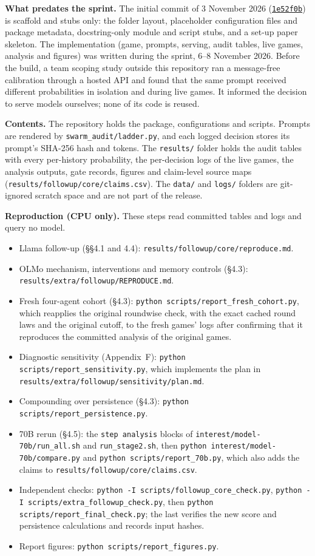 \documentclass[11pt,letterpaper]{article}
\begin{document}
\textbf{What predates the sprint.}
The initial commit of 3 November 2026 (\href{https://github.com/AbdulMusthakin/swarm-audit/commit/1e52f0b}{\texttt{1e52f0b}}) is scaffold and stubs only: the folder layout, placeholder configuration files and package metadata, docstring-only module and script stubs, and a set-up paper skeleton.
The implementation (game, prompts, serving, audit tables, live games, analysis and figures) was written during the sprint, 6--8 November 2026.
Before the build, a team scoping study outside this repository ran a message-free calibration through a hosted API and found that the same prompt received different probabilities in isolation and during live games.
It informed the decision to serve models ourselves; none of its code is reused.

\textbf{Contents.}
The repository holds the package, configurations and scripts.
Prompts are rendered by \texttt{swarm\_audit/ladder.py}, and each logged decision stores its prompt's SHA-256 hash and tokens.
The \texttt{results/} folder holds the audit tables with every per-history probability, the per-decision logs of the live games, the analysis outputs, gate records, figures and claim-level source maps (\texttt{results/followup/core/claims.csv}).
The \texttt{data/} and \texttt{logs/} folders are git-ignored scratch space and are not part of the release.

\textbf{Reproduction (CPU only).}
These steps read committed tables and logs and query no model.
\begin{itemize}
  \item Llama follow-up (§§4.1 and 4.4): \texttt{results/followup/core/reproduce.md}.
  \item OLMo mechanism, interventions and memory controls (§4.3): \texttt{results/extra/followup/REPRODUCE.md}.
  \item Fresh four-agent cohort (§4.3): \texttt{python scripts/report\_fresh\_cohort.py}, which reapplies the original roundwise check, with the exact cached round laws and the original cutoff, to the fresh games' logs after confirming that it reproduces the committed analysis of the original games.
  \item Diagnostic sensitivity (Appendix~F): \texttt{python scripts/report\_sensitivity.py}, which implements the plan in \texttt{results/extra/followup/sensitivity/plan.md}.
  \item Compounding over persistence (§4.3): \texttt{python scripts/report\_persistence.py}.
  \item 70B rerun (§4.5): the \texttt{step analysis} blocks of \texttt{interest/model-70b/run\_all.sh} and \texttt{run\_stage2.sh}, then \texttt{python interest/model-70b/compare.py} and \texttt{python scripts/report\_70b.py}, which also adds the claims to \texttt{results/followup/core/claims.csv}.
  \item Independent checks: \texttt{python -I scripts/followup\_core\_check.py}, \texttt{python -I scripts/extra\_followup\_check.py}, then \texttt{python scripts/report\_final\_check.py}; the last verifies the new score and persistence calculations and records input hashes.
  \item Report figures: \texttt{python scripts/report\_figures.py}.
\end{itemize}
\end{document}
